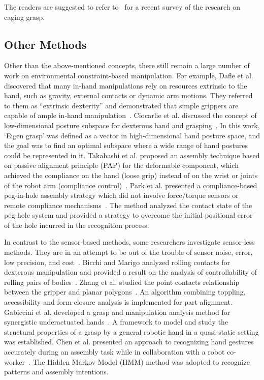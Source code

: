 \documentclass[journal,twoside,web]{ieeecolor}
\begin{document}
The readers are suggested to refer to~\cite{Makita2017} for a recent survey of the research on caging grasp.

\subsection{Other Methods}
\label{subsec:extrinsic}

Other than the above-mentioned concepts, there still remain a large number of work on environmental constraint-based manipulation.
For example, 
Dafle et al. discovered that many in-hand manipulations rely on resources extrinsic to the hand, such as gravity, external contacts or dynamic arm motions. They referred to them as ``extrinsic dexterity'' and demonstrated that simple grippers are capable of ample in-hand manipulation~\cite{Dafle2014a, Dafle2014b}.
Ciocarlie et al. discussed the concept of low-dimensional posture subspace for dexterous hand and grasping~\cite{Ciocarlie2009}. In this work, `Eigen grasp' was defined as a vector in high-dimensional hand posture space, and the goal was to find an optimal subspace where a wide range of hand postures could be represented in it.
Takahashi et al. proposed an assembly technique based on passive alignment principle (PAP) for the deformable component, which achieved the compliance on the hand (loose grip) instead of on the wrist or joints of the robot arm (compliance control)~\cite{Takahashi2016Passive, Fukukawa2016}.
Park et al. presented a compliance-based peg-in-hole assembly strategy which did not involve force/torque sensors or remote compliance mechanisms~\cite{Park2017}. The method analyzed the contact state of the peg-hole system and provided a strategy to overcome the initial positional error of the hole incurred in the recognition process.

In contrast to the sensor-based methods, some researchers investigate sensor-less methods. They are in an attempt to be out of the trouble of sensor noise, error, low precision, and cost~\cite{Erden2010,Pistillo2011,Yao2018}.
Bicchi and Marigo analyzed rolling contacts for dexterous manipulation and provided a result on the analysis of controllability of rolling pairs of bodies~\cite{Bicchi2000c}.
Zhang et al. studied the point contacts relationship between the gripper and planar polygons~\cite{Zhang2002}. An algorithm combining toppling, accessibility and form-closure analysis is implemented for part alignment.
Gabiccini et al. developed a grasp and manipulation analysis method for synergistic underactuated hands~\cite{Gabiccini2012}. A framework to model and study the structural properties of a grasp by a general robotic hand in a quasi-static setting was established.
Chen et al. presented an approach to recognizing hand gestures accurately during an assembly task while in collaboration with a robot co-worker~\cite{Chen2015a}. The Hidden Markov Model (HMM) method was adopted to recognize patterns and assembly intentions.
\end{document}
